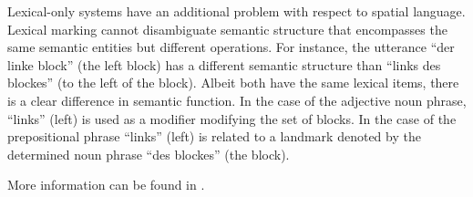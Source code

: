 Lexical-only systems have an additional 
problem with respect to spatial language. 
Lexical marking cannot disambiguate semantic 
structure that encompasses the same semantic 
entities but different operations. For instance, the utterance 
``der linke block'' (the left block) has a different semantic
structure than ``links des blockes'' (to the left of the block). 
Albeit both have the same lexical items, there is a clear difference 
in semantic function. In the case of the adjective noun phrase, 
``links'' (left) is used as a modifier modifying the set of blocks. 
In the case of the prepositional phrase ``links'' (left) is related to a 
landmark denoted by the determined noun phrase ``des blockes'' (the block). 

More information can be found in \cite{spranger2012stages,spranger2013evolutionary}.

% 